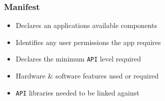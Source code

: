 %
%

\begin{frame}
  \frametitle{Manifest}
  
  \begin{itemize}
  \item<1-> Declares an applications available components
  
  \item<2-> Identifies any user permissions the app requires
    
  \item<3-> Declares the minimum \texttt{API} level required
  
  \item<4-> Hardware \& software features used or required

  \item<5-> \texttt{API} libraries needed to be linked against

  \end{itemize}

\end{frame}


